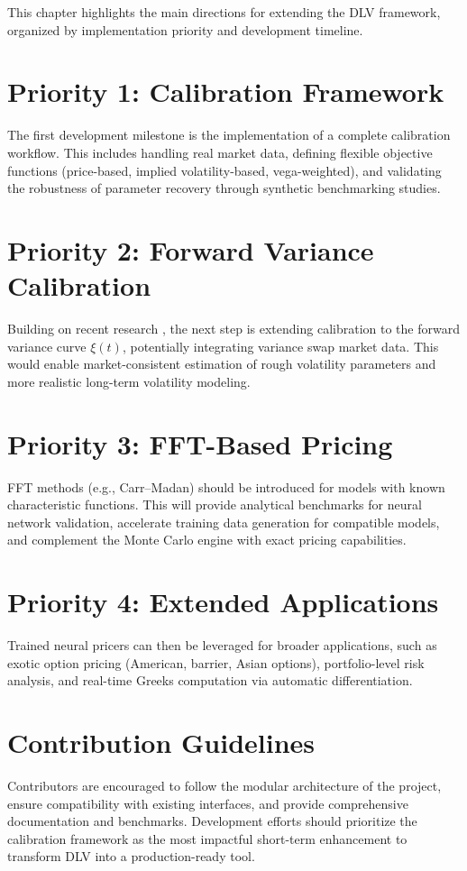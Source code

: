 	This chapter highlights the main directions for extending the DLV framework, organized by implementation priority and development timeline.
	
	\section{Priority 1: Calibration Framework}
	
	The first development milestone is the implementation of a complete calibration workflow.
	This includes handling real market data, defining flexible objective functions (price-based, implied volatility-based, vega-weighted), and validating the robustness of parameter recovery through synthetic benchmarking studies.
	
	\section{Priority 2: Forward Variance Calibration}
	
	Building on recent research \citep{Baschetti2024DeepCalibrationRandomGrids}, the next step is extending calibration to the forward variance curve $\xi(t)$, potentially integrating variance swap market data. This would enable market-consistent estimation of rough volatility parameters and more realistic long-term volatility modeling.
	
	\section{Priority 3: FFT-Based Pricing}
	
	FFT methods (e.g., Carr–Madan) should be introduced for models with known characteristic functions. This will provide analytical benchmarks for neural network validation, accelerate training data generation for compatible models, and complement the Monte Carlo engine with exact pricing capabilities.
	
	\section{Priority 4: Extended Applications}
	
	Trained neural pricers can then be leveraged for broader applications, such as exotic option pricing (American, barrier, Asian options), portfolio-level risk analysis, and real-time Greeks computation via automatic differentiation.
	
	\section{Contribution Guidelines}
	
	Contributors are encouraged to follow the modular architecture of the project, ensure compatibility with existing interfaces, and provide comprehensive documentation and benchmarks. Development efforts should prioritize the calibration framework as the most impactful short-term enhancement to transform DLV into a production-ready tool.
	
	\printbibliography

